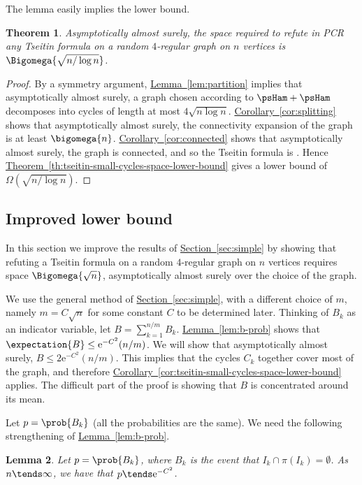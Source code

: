 \documentclass[11pt]{article}
\numberwithin{equation}{section}
\newtheorem{theorem}{Theorem}[section]
\newtheorem{lemma}[theorem]{Lemma}
\theoremstyle{definition}
\theoremstyle{plain}
\newcommand{\eee}{\mathrm e}
\newcommand{\expref}[2]{\hyperref[#2]{#1~\ref{#2}}}
\begin{document}
The lemma easily implies the lower bound.

\begin{theorem} \label{thm:simple}
 Asymptotically almost surely, the space required to refute in PCR any Tseitin formula on a random $4$-regular graph on $n$ vertices is $\Bigomega{\sqrt{n/\log n}}$.
\end{theorem}
\begin{proof}
 By a symmetry argument, \expref{Lemma}{lem:partition} implies that asymptotically almost surely, a graph chosen according to $\psHam + \psHam$ decomposes into cycles of %
 length at most $4\sqrt{n \log n}$. \expref{Corollary}{cor:splitting} shows that asymptotically almost surely, the connectivity expansion of the graph is at least $\bigomega{n}$. \expref{Corollary}{cor:connected} shows that asymptotically almost surely, the graph is connected, and so the Tseitin formula is \Gnonsplittingnot. Hence \expref{Theorem}{th:tseitin-small-cycles-space-lower-bound} gives a lower bound of $\Omega(\sqrt{n/\log n})$.
\end{proof}

\subsection{Improved lower bound} \label{sec:improved}

In this section we improve the results of \expref{Section}{sec:simple} by showing that refuting a \Gnonsplitting Tseitin formula on a random $4$-regular graph on $n$ vertices requires space $\Bigomega{\sqrt{n}}$, asymptotically almost surely over the choice of the graph.

We use the general method of \expref{Section}{sec:simple}, with a different choice of $m$, namely $m = C\sqrt{n}$ for some constant $C$ to be determined later. Thinking of $B_k$ as an indicator variable, let $B = \sum_{k=1}^{n/m} B_k$. \expref{Lemma}{lem:b-prob} shows that $\expectation{B} \leq \eee^{-C^2} (n/m)$. We will show that asymptotically almost surely, $B \leq 2\eee^{-C^2} (n/m)$. This implies that the cycles $C_k$ together cover most of the graph, and therefore \expref{Corollary}{cor:tseitin-small-cycles-space-lower-bound} applies. The difficult part of the proof is showing that $B$ is concentrated around its mean.

Let $p = \prob{B_k}$ (all the probabilities are the same). We need the following strengthening of \expref{Lemma}{lem:b-prob}.

\begin{lemma} \label{lem:b-prob-limit}
 Let $p = \prob{B_k}$, where $B_k$ is the event that $I_k \cap \pi(I_k) = \emptyset$. As $n \tends \infty$, we have that $p \tends \eee^{-C^2}$.
\end{lemma}
\end{document}

